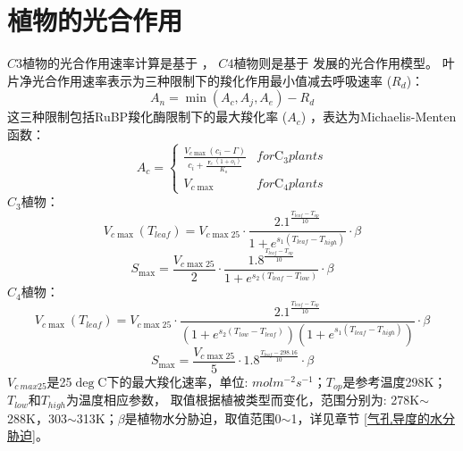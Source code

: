 \section{植物的光合作用}\label{植物的光合作用}
$C3$植物的光合作用速率计算是基于 \citet{farquhar1980biochemical} ，
$C4$植物则是基于\citet{collatz1992} 发展的光合作用模型。
叶片净光合作用速率表示为三种限制下的羧化作用最小值减去呼吸速率 ($R_d$)：
\begin{equation}\label{An1}
A_{n}=\min \left(A_{c}, A_{j}, A_{e}\right)-R_{d}
\end{equation}
这三种限制包括RuBP羧化酶限制下的最大羧化率 ($A_c$) ，表达为Michaelis-Menten函数：
\begin{equation}\label{A_C1}
A_{c}=\left\{\begin{array}{ll}\frac{V_{c \max }\left(c_{i}-\Gamma\right)}{c_{i}+\frac{\digamma_{c}\left(1+o_{i}\right)}{K_{o}}}
     & { for } \mathrm{C}_{3} { plants } \\ V_{c \max } & { for } \mathrm{C}_{4} { plants }\end{array}\right.
\end{equation}
$C_3$植物：\\
\begin{equation}\label{V_cmax_a}
V_{c \max }\left(T_{{leaf }}\right)=V_{c \max 25} \cdot \frac{2.1^{\frac{T_{{leaf }}-T_{o p}}{10}}}{1+e^{s_{1}\left(T_{{leaf }}-T_{{high }}\right)}} \cdot \beta
\end{equation}
\begin{equation}\label{S_max_a}
S_{\max }=\frac{V_{c \max 25}}{2} \cdot \frac{1.8^{\frac{T_{{leaf }}-T_{o p}}{10}}}{1+e^{s_{2}\left(T_{{leaf }}-T_{{low }}\right)}} \cdot \beta
\end{equation}
$C_4$植物：\\
\begin{equation}\label{V_cmax_b}
V_{c \max }\left(T_{{leaf }}\right)=V_{c \max 25} \cdot \frac{2.1^{\frac{T_{{leaf }}-T_{o p}}{10}}}{\left(1+e^{s_{2}\left(T_{{low }}
 - T_{{leaf }}\right)}\right)\left(1+e^{s_{1}\left(T_{{leaf }}-T_{h i g h}\right)}\right)} \cdot \beta
\end{equation}
\begin{equation}\label{S_max_b}
S_{\max }=\frac{V_{c \max 25}}{5} \cdot 1.8^{\frac{T_{{leaf }}-298.16}{10}} \cdot \beta
\end{equation}
$V_{c\ max25}$是25$\deg$C下的最大羧化速率，单位: $mol m^{-2}s^{-1}$；$T_{op}$是参考温度298K；$T_{low}$和$T_{high}$为温度相应参数，
取值根据植被类型而变化，范围分别为: 278K$\sim$288K，303$\sim$313K；$\beta$是植物水分胁迫，取值范围0$\sim$1，详见章节 \ref{气孔导度的水分胁迫}。

